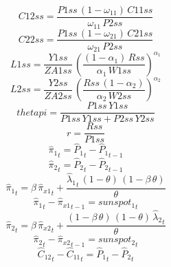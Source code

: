 \begin{dmath*}
C12ss = \frac{{P1ss}\, \left(1-{{\omega_{11}}}\right)\, {C11ss}}{{{\omega_{11}}}\, {P2ss}}
\end{dmath*}
\begin{dmath*}
C22ss = \frac{{P1ss}\, \left(1-{{\omega_{21}}}\right)\, {C21ss}}{{{\omega_{21}}}\, {P2ss}}
\end{dmath*}
\begin{dmath*}
L1ss = \frac{{Y1ss}}{{ZA1ss}}\, \left(\frac{\left(1-{{\alpha_{1}}}\right)\, {Rss}}{{{\alpha_{1}}}\, {W1ss}}\right)^{{{\alpha_{1}}}}
\end{dmath*}
\begin{dmath*}
L2ss = \frac{{Y2ss}}{{ZA2ss}}\, \left(\frac{{Rss}\, \left(1-{{\alpha_{2}}}\right)}{{{\alpha_{2}}}\, {W2ss}}\right)^{{{\alpha_{2}}}}
\end{dmath*}
\begin{dmath*}
thetapi = \frac{{P1ss}\, {Y1ss}}{{P1ss}\, {Y1ss}+{P2ss}\, {Y2ss}}
\end{dmath*}
\begin{dmath*}
r = \frac{{Rss}}{{P1ss}}
\end{dmath*}
\begin{dmath}
{{\hat{\pi}_{1}}}_{t}={{\hat{P}_{1}}}_{t}-{{\hat{P}_{1}}}_{t-1}
\end{dmath}
\begin{dmath}
{{\hat{\pi}_{2}}}_{t}={{\hat{P}_{2}}}_{t}-{{\hat{P}_{2}}}_{t-1}
\end{dmath}
\begin{dmath}
{{\hat{\pi}_{1}}}_{t}={{\beta}}\, {{\hat{\pi}_{x1}}}_{t}+\frac{{{\hat{\lambda}_{1}}}_{t}\, \left(1-{{\theta}}\right)\, \left(1-{{\beta}}\, {{\theta}}\right)}{{{\theta}}}
\end{dmath}
\begin{dmath}
{{\hat{\pi}_{1}}}_{t}-{{\hat{\pi}_{x1}}}_{t-1}={{sunspot_{1}}}_{t}
\end{dmath}
\begin{dmath}
{{\hat{\pi}_{2}}}_{t}={{\beta}}\, {{\hat{\pi}_{x2}}}_{t}+\frac{\left(1-{{\beta}}\, {{\theta}}\right)\, \left(1-{{\theta}}\right)\, {{\hat{\lambda}_{2}}}_{t}}{{{\theta}}}
\end{dmath}
\begin{dmath}
{{\hat{\pi}_{2}}}_{t}-{{\hat{\pi}_{x2}}}_{t-1}={{sunspot_{2}}}_{t}
\end{dmath}
\begin{dmath}
{{\hat{C}_{12}}}_{t}-{{\hat{C}_{11}}}_{t}={{\hat{P}_{1}}}_{t}-{{\hat{P}_{2}}}_{t}
\end{dmath}
